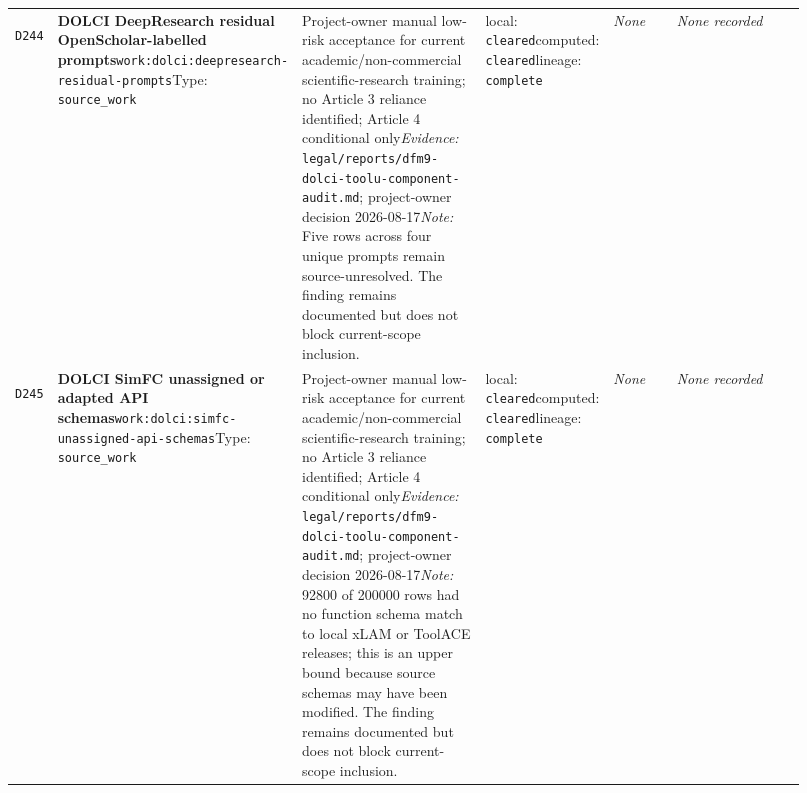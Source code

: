 \documentclass[9pt,a4paper]{article}
\newcommand{\depid}[1]{\hypertarget{dep:#1}{\texttt{#1}}}
\begin{document}
\begin{landscape}
\begin{longtable}{@{}L{0.035\linewidth}L{0.185\linewidth}L{0.27\linewidth}L{0.09\linewidth}L{0.10\linewidth}L{0.24\linewidth}@{}}
\depid{D244} & \textbf{DOLCI DeepResearch residual OpenScholar-labelled prompts}\newline \nolinkurl{work:dolci:deepresearch-residual-prompts}\newline Type: \texttt{source\_work} & Project-owner manual low-risk acceptance for current academic/non-commercial scientific-research training; no Article 3 reliance identified; Article 4 conditional only\newline \textit{Evidence:} \nolinkurl{legal/reports/dfm9-dolci-toolu-component-audit.md}; project-owner decision 2026-08-17\newline \textit{Note:} Five rows across four unique prompts remain source-unresolved. The finding remains documented but does not block current-scope inclusion. & local: \texttt{cleared}\newline computed: \texttt{cleared}\newline lineage: \texttt{complete} & \textit{None} & \textit{None recorded} \\
\depid{D245} & \textbf{DOLCI SimFC unassigned or adapted API schemas}\newline \nolinkurl{work:dolci:simfc-unassigned-api-schemas}\newline Type: \texttt{source\_work} & Project-owner manual low-risk acceptance for current academic/non-commercial scientific-research training; no Article 3 reliance identified; Article 4 conditional only\newline \textit{Evidence:} \nolinkurl{legal/reports/dfm9-dolci-toolu-component-audit.md}; project-owner decision 2026-08-17\newline \textit{Note:} 92800 of 200000 rows had no function schema match to local xLAM or ToolACE releases; this is an upper bound because source schemas may have been modified. The finding remains documented but does not block current-scope inclusion. & local: \texttt{cleared}\newline computed: \texttt{cleared}\newline lineage: \texttt{complete} & \textit{None} & \textit{None recorded} \\

\end{longtable}
\end{landscape}
\end{document}
